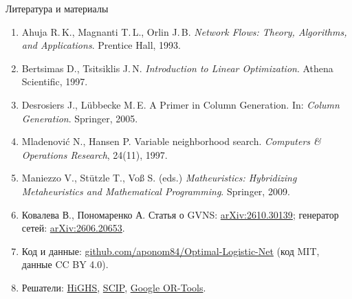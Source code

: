 \documentclass[aspectratio=169,10pt]{beamer}
\begin{document}
\begin{frame}{Литература и материалы}
\small
\begin{enumerate}\setlength{\itemsep}{3pt}
\item Ahuja R.\,K., Magnanti T.\,L., Orlin J.\,B. \emph{Network Flows: Theory, Algorithms, and Applications}. Prentice Hall, 1993.
\item Bertsimas D., Tsitsiklis J.\,N. \emph{Introduction to Linear Optimization}. Athena Scientific, 1997.
\item Desrosiers J., Lübbecke M.\,E. A Primer in Column Generation. In: \emph{Column Generation}. Springer, 2005.
\item Mladenović N., Hansen P. Variable neighborhood search. \emph{Computers \& Operations Research}, 24(11), 1997.
\item Maniezzo V., Stützle T., Voß S. (eds.) \emph{Matheuristics: Hybridizing Metaheuristics and Mathematical Programming}. Springer, 2009.
\item Ковалева В., Пономаренко А. Статья о GVNS: \href{https://arxiv.org/abs/2610.30139}{arXiv:2610.30139}; генератор сетей: \href{https://arxiv.org/abs/2606.20653}{arXiv:2606.20653}.
\item Код и данные: \href{https://github.com/aponom84/Optimal-Logistic-Net}{github.com/aponom84/Optimal-Logistic-Net} (код MIT, данные CC BY 4.0).
\item Решатели: \href{https://highs.dev}{HiGHS}, \href{https://www.scipopt.org}{SCIP}, \href{https://developers.google.com/optimization}{Google OR-Tools}.
\end{enumerate}
\end{frame}

\end{document}
